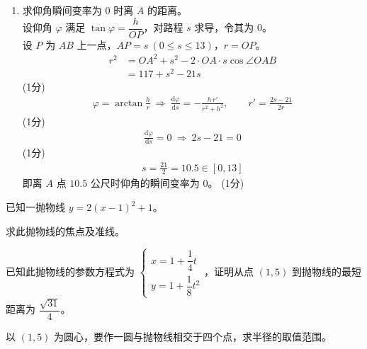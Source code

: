 \begin{solution}
\begin{enumerate}[label=(\alph*)]
        \item 求仰角瞬间变率为 $0$ 时离 $A$ 的距离。\\
        设仰角 $\varphi$ 满足 $\tan\varphi=\dfrac{h}{OP}$，对路程 $s$ 求导，令其为 $0$。\\
        设 $P$ 为 $AB$ 上一点，$AP=s\ (0\le s\le13)$，$r=OP$。\\
        \begin{align*}
            r^2 &=OA^2+s^2-2\cdot OA\cdot s\cos\angle OAB \\
            &=117+s^2-21s
        \end{align*}
        \hfill (1分) \\
        \begin{align*}
            \varphi=\arctan\frac{h}{r}\ \Rightarrow\
            \frac{\mathrm{d}\varphi}{\mathrm{d}s}=-\frac{h\,r'}{r^2+h^2},\qquad
            r'=\frac{2s-21}{2r}
        \end{align*}
        \hfill (1分) \\
        \begin{align*}
            \frac{\mathrm{d}\varphi}{\mathrm{d}s}=0\ \Rightarrow\ 2s-21=0
        \end{align*}
        \hfill (1分) \\
        \begin{align*}
            s=\frac{21}{2}=10.5\in[0,13]
        \end{align*}
        即离 $A$ 点 $10.5$ 公尺时仰角的瞬间变率为 $0$。 \hfill (1分)
    \end{enumerate}
\end{solution}

\begin{question}[points = 10]
    已知一抛物线 $y=2(x-1)^2+1$。
    \begin{questionparts}
        \item 求此抛物线的焦点及准线。 

        \item 已知此抛物线的参数方程式为 $\begin{cases} x=1+\dfrac14t \\[2mm] y=1+\dfrac18t^2 \end{cases}$，证明从点 $(1,5)$ 到抛物线的最短距离为 $\dfrac{\sqrt{31}}{4}$。 

        \item 以 $(1,5)$ 为圆心，要作一圆与抛物线相交于四个点，求半径的取值范围。 
    \end{questionparts}
\end{question}

